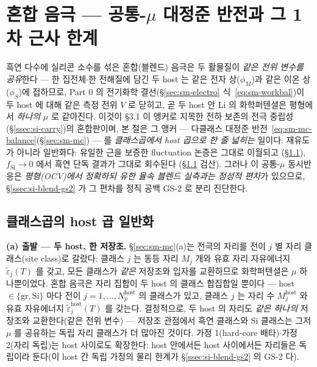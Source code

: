 \section{혼합 음극 --- 공통-$\mu$ 대정준 반전과 그 1차 근사 한계}\label{sec:si-blend}
흑연 다수에 실리콘 소수를 섞은 혼합(블렌드) 음극은 두 활물질이 \emph{같은 전위 변수를 공유}한다 ---
한 집전체$\cdot$한 전해질에 담긴 두 host 는 같은 전자 상($\phi_M$)과 같은 이온 상($\phi_S$)에 접하므로,
Part 0 의 전기화학 결선(\S\ref{sec:sm-electro} 식~\eqref{eq:sm-workbal})이 두 host 에 대해 같은 측정
전위 $V$ 로 닫히고, 곧 두 host 안 Li 의 화학퍼텐셜은 평형에서 \emph{하나의} $\mu$ 로 같아진다. 이것이
§3.1 이 앵커로 지목한 전하 보존의 전극 중립성(\S\ref{ssec:si-carry})의 혼합판이며, 본 절은 그
앵커 --- 다클래스 대정준 반전~\eqref{eq:sm-mc-balance}(\S\ref{sec:sm-mc}) --- 를 \emph{클래스곱에서
host 곱으로 한 줄 넓히는} 일이다. 재유도가 아니라 일반화다: 유일한 근을 보증한 fluctuation 논증은 그대로 이월되고
(\S\ref{ssec:si-blend-derive}), $f_\mathrm{Si}\to0$ 에서 흑연 단독 결과가 그대로 회수된다
(\S\ref{ssec:si-blend-derive} 검산). 그러나 이 공통-$\mu$ 동시반응은 \emph{평형(OCV)에서 정확하되 유한
율속 블렌드 실측과는 정성적 편차}가 있으므로, \S\ref{ssec:si-blend-gs2} 가 그 편차를 정직 공백 GS-2 로
분리 진단한다.

\subsection{클래스곱의 host 곱 일반화}\label{ssec:si-blend-derive}
\textbf{(a) 출발 --- 두 host, 한 저장조.} \S\ref{sec:sm-mc}(a)는 전극의 자리를 전이 $j$ 별 자리
클래스(site class)로 갈랐다: 클래스 $j$ 는 동등 자리 $M_j$ 개와 유효 자리 자유에너지
$\tilde\varepsilon_j(T)$ 를 갖고, 모든 클래스가 \emph{같은} 저장조와 입자를 교환하므로 화학퍼텐셜은
$\mu$ 하나뿐이었다. 혼합 음극은 자리 집합이 두 host 의 클래스 합집합일 뿐이다 --- host $\in\{\mathrm{gr},
\mathrm{Si}\}$ 마다 전이 $j=1,\dots,N_p^\mathrm{host}$ 의 클래스가 있고, 클래스 $j$ 는 자리 수
$M_j^\mathrm{host}$ 와 유효 자유에너지 $\tilde\varepsilon_j^\mathrm{host}(T)$ 를 갖는다. 결정적으로, 두
host 의 자리도 \emph{같은 하나의} 저장조와 교환한다(같은 전위 변수) --- 저장조 관점에서 흑연 클래스와
Si 클래스는 그저 $\mu$ 를 공유하는 독립 자리 클래스가 더 많아진 것이다. 가정 1(hard-core 배타)$\cdot$가정
2(자리 독립)는 host 사이로도 확장한다: host 안에서든 host 사이에서든 자리들은 독립이라 둔다(이 host 간
독립 가정의 물리 한계가 \S\ref{ssec:si-blend-gs2} 의 GS-2 다).

